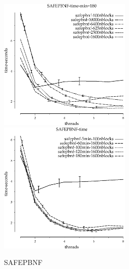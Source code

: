 \documentclass{article}
\begin{document}
\begin{figure}
\begin{center}
\includegraphics[width=2.5in]{SAFEPBNF-time-min=180}
\includegraphics[width=2.5in]{SAFEPBNF-time}
\end{center}
\caption{SAFEPBNF}
\end{figure}
\end{document}
